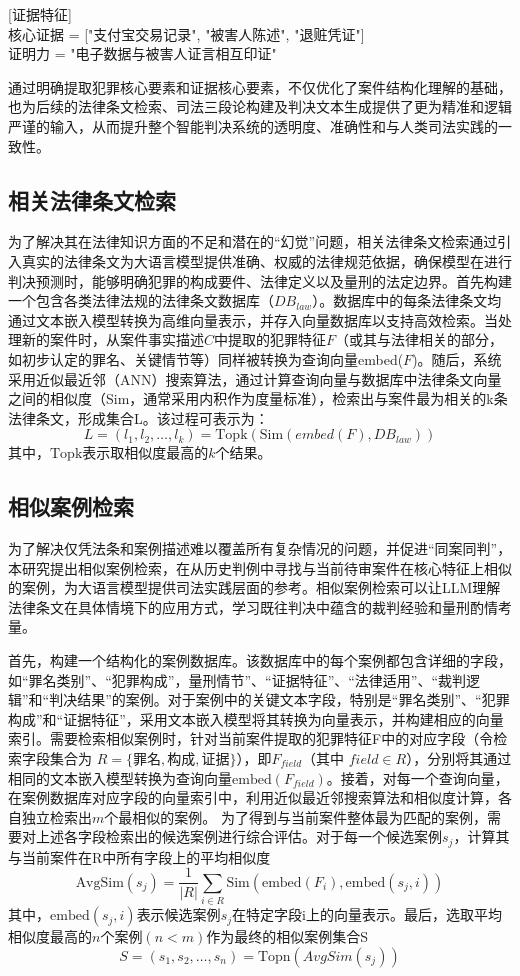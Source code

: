 [证据特征]
\\
核心证据 = ["支付宝交易记录", "被害人陈述", "退赃凭证"]
\\
证明力 = "电子数据与被害人证言相互印证"


通过明确提取犯罪核心要素和证据核心要素，不仅优化了案件结构化理解的基础，也为后续的法律条文检索、司法三段论构建及判决文本生成提供了更为精准和逻辑严谨的输入，从而提升整个智能判决系统的透明度、准确性和与人类司法实践的一致性。
\subsection{\heiti 相关法律条文检索}
为了解决其在法律知识方面的不足和潜在的“幻觉”问题，相关法律条文检索通过引入真实的法律条文为大语言模型提供准确、权威的法律规范依据，确保模型在进行判决预测时，能够明确犯罪的构成要件、法律定义以及量刑的法定边界。首先构建一个包含各类法律法规的法律条文数据库（$DB_{law}$​）。数据库中的每条法律条文均通过文本嵌入模型转换为高维向量表示，并存入向量数据库以支持高效检索。当处理新的案件时，从案件事实描述$C$中提取的犯罪特征$F$（或其与法律相关的部分，如初步认定的罪名、关键情节等）同样被转换为查询向量embed($F$)。随后，系统采用近似最近邻（ANN）搜索算法，通过计算查询向量与数据库中法律条文向量之间的相似度（Sim，通常采用内积作为度量标准），检索出与案件最为相关的k条法律条文，形成集合L。该过程可表示为：
$$L=(l_1​,l_2​,\dots,l_k​)=\text{Topk}​(\text{Sim}(embed(F),DB_{law}))$$
其中，$\text{Topk}​$表示取相似度最高的$k$个结果。
\subsection{\heiti 相似案例检索}
为了解决仅凭法条和案例描述难以覆盖所有复杂情况的问题，并促进“同案同判”， 本研究提出相似案例检索，在从历史判例中寻找与当前待审案件在核心特征上相似的案例，为大语言模型提供司法实践层面的参考。相似案例检索可以让LLM理解法律条文在具体情境下的应用方式，学习既往判决中蕴含的裁判经验和量刑酌情考量。

首先，构建一个结构化的案例数据库。该数据库中的每个案例都包含详细的字段，如“罪名类别”、“犯罪构成”，量刑情节”、“证据特征”、“法律适用”、“裁判逻辑”和“判决结果”的案例。对于案例中的关键文本字段，特别是“罪名类别”、“犯罪构成”和“证据特征”，采用文本嵌入模型将其转换为向量表示，并构建相应的向量索引。需要检索相似案例时，针对当前案件提取的犯罪特征F中的对应字段（令检索字段集合为 $R=\{\text{罪名},\text{构成},\text{证据}\}$），即$F_{field}$​（其中 $field \in R$），分别将其通过相同的文本嵌入模型转换为查询向量$\text{embed}(F_{field})$。接着，对每一个查询向量，在案例数据库对应字段的向量索引中，利用近似最近邻搜索算法和相似度计算，各自独立检索出$m$个最相似的案例。
为了得到与当前案件整体最为匹配的案例，需要对上述各字段检索出的候选案例进行综合评估。对于每一个候选案例$s_j$​，计算其与当前案件在R中所有字段上的平均相似度
$$
	\text{AvgSim}(s_j​)=\frac{1}{|R|}\sum_{i\in R}\text{​Sim}(\text{embed}(F_{i}​),\text{embed}(s_j,i))
$$
其中，$\text{embed}(s_j,i)$表示候选案例$s_j$​在特定字段$\text{i}$上的向量表示。最后，选取平均相似度最高的$n$个案例$(n<m)$作为最终的相似案例集合S
$$
	S=(s_1​,s_2​,\dots,s_n​)=\text{Topn​}(AvgSim(s_j​))
$$

